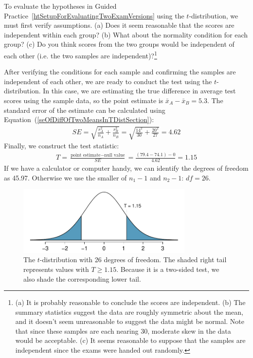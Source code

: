 \begin{exercise} \label{conditionsForTDistForEvaluatingTwoExamVersions}
To evaluate the hypotheses in Guided Practice~\ref{htSetupForEvaluatingTwoExamVersions} using the $t$-distribution, we must first verify assumptions. (a) Does it seem reasonable that the scores are independent within each group? (b) What about the normality condition for each group? (c) Do you think scores from the two groups would be independent of each other (i.e. the two samples are independent)?\footnote{(a) It is probably reasonable to conclude the scores are independent. (b) The summary statistics suggest the data are roughly symmetric about the mean, and it doesn't seem unreasonable to suggest the data might be normal. Note that since these samples are each nearing 30, moderate skew in the data would be acceptable. (c) It seems reasonable to suppose that the samples are independent since the exams were handed out randomly.}
\end{exercise}

After verifying the conditions for each sample and confirming the samples are independent of each other, we are ready to conduct the test using the $t$-distribution. In this case, we are estimating the true difference in average test scores using the sample data, so the point estimate is $\bar{x}_A - \bar{x}_B = 5.3$. The standard error of the estimate can be calculated using Equation~(\ref{seOfDiffOfTwoMeansInTDistSection}):
\begin{eqnarray*}
SE = \sqrt{\frac{s_A^2}{n_A} + \frac{s_B^2}{n_B}} = \sqrt{\frac{14^2}{30} + \frac{20^2}{27}} = 4.62
\end{eqnarray*}
Finally, we construct the test statistic:
\begin{eqnarray*}
T = \frac{\text{point estimate} - \text{null value}}{SE} = \frac{(79.4-74.1) - 0}{4.62} = 1.15
\end{eqnarray*}
If we have a calculator or computer handy, we can identify the degrees of freedom as 45.97. Otherwise we use the smaller of $n_1-1$ and $n_2-1$: $df=26$.

\begin{figure}
\centering
\includegraphics[width=0.78\textwidth]{ch_inference_for_means/figures/pValueOfTwoTailAreaOfExamVersionsWhereDFIs26/pValueOfTwoTailAreaOfExamVersionsWhereDFIs26}
\caption{The $t$-distribution with 26 degrees of freedom. The shaded right tail represents values with $T \geq 1.15$. Because it is a two-sided test, we also shade the corresponding lower tail.}
\label{pValueOfTwoTailAreaOfExamVersionsWhereDFIs26}
\end{figure}

